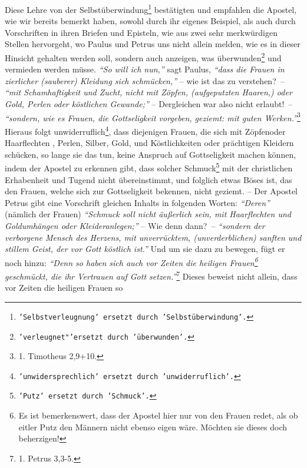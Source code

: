 Diese Lehre von der Selbstüberwindung\footnote{\texttt{'Selbstverleugnung'
ersetzt
durch 'Selbstüberwindung'.}} bestätigten und empfahlen die Apostel, wie
wir bereits bemerkt haben, sowohl durch ihr eigenes Beispiel, als auch durch
Vorschriften in ihren Briefen und Episteln, wie aus zwei sehr merkwürdigen
Stellen hervorgeht, wo Paulus und Petrus uns nicht allein melden, wie es in
dieser Hinsicht gehalten werden soll, sondern auch anzeigen, was
überwunden\footnote{\texttt{'verleugnet"'ersetzt durch 'überwunden'.}} und
vermieden werden müsse. \textit{"`So will ich nun,"'} sagt
Paulus,
\textit{"`dass die Frauen in
zierlicher (sauberer) Kleidung sich schmücken,"'} -- wie ist das zu verstehen?~--
\textit{"`mit Schamhaftigkeit und Zucht, nicht mit Zöpfen, (aufgeputzten
Haaren,) oder
Gold, Perlen oder köstlichen Gewande;"'} -- Dergleichen war also nicht
erlaubt!~-- \textit{"`sondern, wie es Frauen, die Gottseligkeit vorgeben,
geziemt: mit
guten Werken."'}\footnote{1. Timotheus 2,9+10.}
Hieraus folgt unwiderruflich\footnote{\texttt{'unwidersprechlich' ersetzt durch
'unwiderruflich'.}}, dass
diejenigen Frauen, die sich mit Zöpfenoder
Haarflechten \label{ref:haarflechten}, Perlen, Silber, Gold,
und Köstlichkeiten oder prächtigen Kleidern schücken, so lange sie das tun,
keine Anspruch auf Gottseligkeit machen können, indem der
Apostel zu erkennen
gibt, dass solcher Schmuck\footnote{\texttt{'Putz' ersetzt durch 'Schmuck'.}}
mit
der christlichen Erhabenheit und Tugend nicht
übereinstimmt, und folglich etwas Böses ist, das den Frauen, welche sich zur
Gottseligkeit bekennen, nicht geziemt. -- Der Apostel Petrus gibt eine
Vorschrift gleichen Inhalts in folgenden Worten: \textit{"`Deren"'} (nämlich der
Frauen)
\textit{"`Schmuck soll nicht äußerlich sein, mit Haarflechten und Goldumhängen
oder
Kleideranlegen;"'} -- Wie denn dann?~--
\textit{"`sondern der verborgene Mensch des Herzens,
mit unverrücktem, (unverderblichen) sanften und stillem Geist, der vor Gott
köstlich ist."'} Und um sie dazu zu bewegen, fügt er noch hinzu:
\textit{"`Denn so haben
sich auch vor Zeiten die heiligen Frauen\footnote{Es ist bemerkenswert, dass der
Apostel hier nur von den Frauen redet, als ob eitler Putz den
Männern nicht ebenso eigen wäre. Möchten sie dieses doch beherzigen!}
geschmückt,
die ihr Vertrauen auf Gott setzen."'}\footnote{1. Petrus 3,3-5.}
Dieses beweist nicht allein, dass vor Zeiten die heiligen
Frauen so
